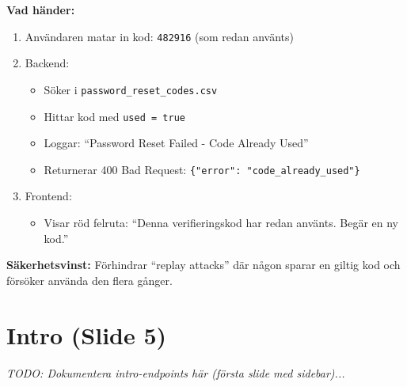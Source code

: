 \documentclass[12pt,a4paper]{article}
\begin{document}
\textbf{Vad händer:}
\begin{enumerate}[noitemsep]
  \item Användaren matar in kod: \texttt{482916} (som redan använts)
  \item Backend:
  \begin{itemize}[noitemsep]
    \item Söker i \texttt{password\_reset\_codes.csv}
    \item Hittar kod med \texttt{used = true}
    \item Loggar: ``Password Reset Failed - Code Already Used''
    \item Returnerar 400 Bad Request: \texttt{\{"error": "code\_already\_used"\}}
  \end{itemize}
  \item Frontend:
  \begin{itemize}[noitemsep]
    \item Visar röd felruta: ``Denna verifieringskod har redan använts. Begär en ny kod.''
  \end{itemize}
\end{enumerate}

\textbf{Säkerhetsvinst:} Förhindrar ``replay attacks'' där någon sparar en giltig kod och försöker använda den flera gånger.

\newpage



\section{Intro (Slide 5)}

\textit{TODO: Dokumentera intro-endpoints här (första slide med sidebar)...}

\newpage

\end{document}
